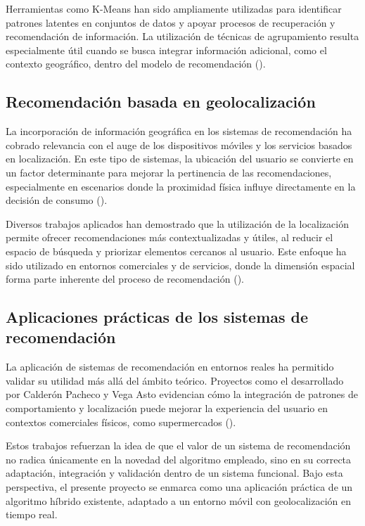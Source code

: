\documentclass[11pt, letterpaper]{article}
\begin{document}
	Herramientas como K-Means han sido ampliamente utilizadas para identificar patrones latentes en conjuntos de datos y apoyar procesos de recuperación y recomendación de información. La utilización de técnicas de agrupamiento resulta especialmente útil cuando se busca integrar información adicional, como el contexto geográfico, dentro del modelo de recomendación (\cite{clusterdoc_agrupamiento}).
	
	\subsection{Recomendación basada en geolocalización}
	La incorporación de información geográfica en los sistemas de recomendación ha cobrado relevancia con el auge de los dispositivos móviles y los servicios basados en localización. En este tipo de sistemas, la ubicación del usuario se convierte en un factor determinante para mejorar la pertinencia de las recomendaciones, especialmente en escenarios donde la proximidad física influye directamente en la decisión de consumo (\cite{revision_sr_turismo}).
	
	Diversos trabajos aplicados han demostrado que la utilización de la localización permite ofrecer recomendaciones más contextualizadas y útiles, al reducir el espacio de búsqueda y priorizar elementos cercanos al usuario. Este enfoque ha sido utilizado en entornos comerciales y de servicios, donde la dimensión espacial forma parte inherente del proceso de recomendación (\cite{supermercado_recomendacion_localizacion}).
	
	\subsection{Aplicaciones prácticas de los sistemas de recomendación}
	
	La aplicación de sistemas de recomendación en entornos reales ha permitido validar su utilidad más allá del ámbito teórico. Proyectos como el desarrollado por Calderón Pacheco y Vega Asto evidencian cómo la integración de patrones de comportamiento y localización puede mejorar la experiencia del usuario en contextos comerciales físicos, como supermercados (\cite{supermercado_recomendacion_localizacion}).
	
	Estos trabajos refuerzan la idea de que el valor de un sistema de recomendación no radica únicamente en la novedad del algoritmo empleado, sino en su correcta adaptación, integración y validación dentro de un sistema funcional. Bajo esta perspectiva, el presente proyecto se enmarca como una aplicación práctica de un algoritmo híbrido existente, adaptado a un entorno móvil con geolocalización en tiempo real.
	
\end{document}
